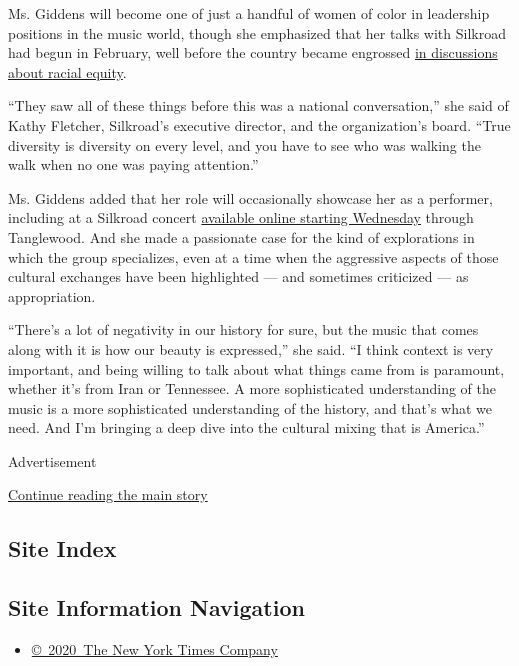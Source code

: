Ms. Giddens will become one of just a handful of women of color in
leadership positions in the music world, though she emphasized that her
talks with Silkroad had begun in February, well before the country
became engrossed
\href{https://www.nytimes3xbfgragh.onion/2020/07/16/arts/music/black-classical-music-opera.html}{in
discussions about racial equity}.

``They saw all of these things before this was a national
conversation,'' she said of Kathy Fletcher, Silkroad's executive
director, and the organization's board. ``True diversity is diversity on
every level, and you have to see who was walking the walk when no one
was paying attention.''

Ms. Giddens added that her role will occasionally showcase her as a
performer, including at a Silkroad concert
\href{https://www.bso.org/Performance/Detail/111125}{available online
starting Wednesday} through Tanglewood. And she made a passionate case
for the kind of explorations in which the group specializes, even at a
time when the aggressive aspects of those cultural exchanges have been
highlighted --- and sometimes criticized --- as appropriation.

``There's a lot of negativity in our history for sure, but the music
that comes along with it is how our beauty is expressed,'' she said. ``I
think context is very important, and being willing to talk about what
things came from is paramount, whether it's from Iran or Tennessee. A
more sophisticated understanding of the music is a more sophisticated
understanding of the history, and that's what we need. And I'm bringing
a deep dive into the cultural mixing that is America.''

Advertisement

\protect\hyperlink{after-bottom}{Continue reading the main story}

\hypertarget{site-index}{%
\subsection{Site Index}\label{site-index}}

\hypertarget{site-information-navigation}{%
\subsection{Site Information
Navigation}\label{site-information-navigation}}

\begin{itemize}
\tightlist
\item
  \href{https://help.nytimes3xbfgragh.onion/hc/en-us/articles/115014792127-Copyright-notice}{©~2020~The
  New York Times Company}
\end{itemize}

